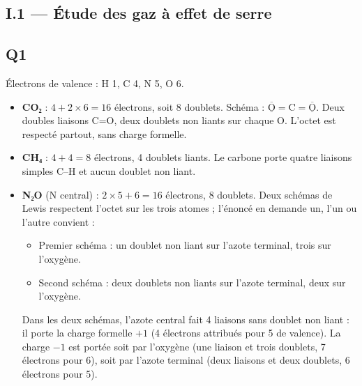 \documentclass[11pt,a4paper]{article}
\providecommand{\tightlist}{\setlength{\itemsep}{0pt}\setlength{\parskip}{0pt}}
\newcommand{\equationajustee}[1]{%
  \sbox{\boiteequation}{$\displaystyle #1$}%
  \ifdim\wd\boiteequation>\linewidth
    \[\resizebox{\linewidth}{!}{\usebox{\boiteequation}}\]%
  \else
    \[#1\]%
  \fi}
\begin{document}
\hypertarget{i.1-uxe9tude-des-gaz-uxe0-effet-de-serre}{%
\subsection{I.1 --- Étude des gaz à effet de serre}\label{i.1-uxe9tude-des-gaz-uxe0-effet-de-serre}}

\hypertarget{q1}{%
\subsection{Q1}\label{q1}}

Électrons de valence : H 1, C 4, N 5, O 6.

\begin{itemize}
\tightlist
\item
  \textbf{CO₂} : \(4+2\times6=16\) électrons, soit 8 doublets. Schéma : \(\overline{\underline{\text{O}}}\!=\!\text{C}\!=\!\overline{\underline{\text{O}}}\). Deux doubles liaisons C=O, deux doublets non liants sur chaque O. L'octet est respecté partout, sans charge formelle.
\item
  \textbf{CH₄} : \(4+4=8\) électrons, 4 doublets liants. Le carbone porte quatre liaisons simples C--H et aucun doublet non liant.
\item
  \textbf{N₂O} (N central) : \(2\times5+6=16\) électrons, 8 doublets. Deux schémas de Lewis respectent l'octet sur les trois atomes ; l'énoncé en demande un, l'un ou l'autre convient :
  \equationajustee{\begin{aligned}{}&\text{N}\equiv\overset{\oplus}{\text{N}}-\overset{\ominus}{\text{O}}\\
  \text{ou}\quad&\overset{\ominus}{\text{N}}=\overset{\oplus}{\text{N}}=\text{O}
  \end{aligned}}

  \begin{itemize}
  \tightlist
  \item
    Premier schéma : un doublet non liant sur l'azote terminal, trois sur l'oxygène.
  \item
    Second schéma : deux doublets non liants sur l'azote terminal, deux sur l'oxygène.
  \end{itemize}

  Dans les deux schémas, l'azote central fait 4 liaisons sans doublet non liant : il porte la charge formelle \(+1\) (4 électrons attribués pour 5 de valence). La charge \(-1\) est portée soit par l'oxygène (une liaison et trois doublets, 7 électrons pour 6), soit par l'azote terminal (deux liaisons et deux doublets, 6 électrons pour 5).
\end{itemize}
\end{document}

